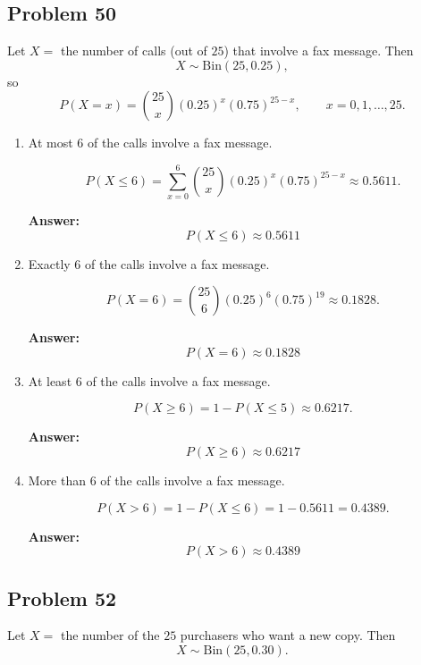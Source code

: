 \documentclass[11pt]{article}
\begin{document}
\subsection*{Problem 50}

Let \(X=\) the number of calls (out of \(25\)) that involve a fax message. Then
\[
X\sim \mathrm{Bin}(25,0.25),
\]
so
\[
P(X=x)=\binom{25}{x}(0.25)^x(0.75)^{25-x}, \qquad x=0,1,\dots,25.
\]

\begin{enumerate}
    \item[(a)] At most \(6\) of the calls involve a fax message.

    \[
    P(X\le 6)=\sum_{x=0}^{6}\binom{25}{x}(0.25)^x(0.75)^{25-x}
    \approx 0.5611.
    \]

    \textbf{Answer:}
    \[
    \boxed{P(X\le 6)\approx 0.5611}
    \]

    \item[(b)] Exactly \(6\) of the calls involve a fax message.

    \[
    P(X=6)=\binom{25}{6}(0.25)^6(0.75)^{19}\approx 0.1828.
    \]

    \textbf{Answer:}
    \[
    \boxed{P(X=6)\approx 0.1828}
    \]

    \item[(c)] At least \(6\) of the calls involve a fax message.

    \[
    P(X\ge 6)=1-P(X\le 5)\approx 0.6217.
    \]

    \textbf{Answer:}
    \[
    \boxed{P(X\ge 6)\approx 0.6217}
    \]

    \item[(d)] More than \(6\) of the calls involve a fax message.

    \[
    P(X>6)=1-P(X\le 6)=1-0.5611=0.4389.
    \]

    \textbf{Answer:}
    \[
    \boxed{P(X>6)\approx 0.4389}
    \]
\end{enumerate}

\subsection*{Problem 52}

Let \(X=\) the number of the \(25\) purchasers who want a new copy. Then
\[
X\sim \mathrm{Bin}(25,0.30).
\]
\end{document}
